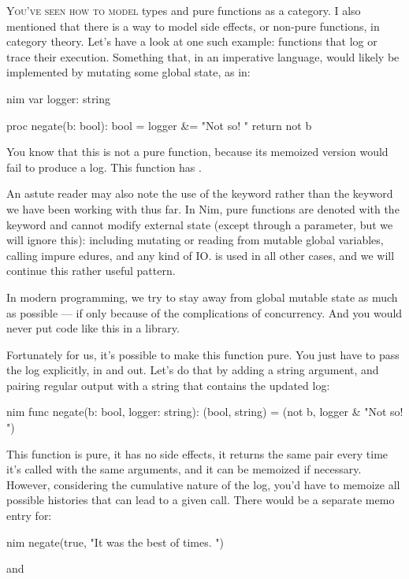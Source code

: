 
\lettrine[lhang=0.17]{Y}{ou've seen how to model} types and pure functions as a category. I also
mentioned that there is a way to model side effects, or non-pure
functions, in category theory. Let's have a look at one such example:
functions that log or trace their execution. Something that, in an
imperative language, would likely be implemented by mutating some global
state, as in:

\begin{snip}{nim}
var logger: string

proc negate(b: bool): bool =
  logger &= "Not so! "
  return not b
\end{snip}
You know that this is not a pure function, because its memoized version
would fail to produce a log. This function has .

An astute reader may also note the use of the  keyword rather
than the  keyword we have been working with thus far. In Nim, pure
functions are denoted with the  keyword and cannot modify external
state (except through a  parameter, but we will ignore this):
including mutating or reading from mutable global variables, calling impure
edures, and any kind of IO.  is used in all other cases,
and we will continue this rather useful pattern.

In modern programming, we try to stay away from global mutable state as
much as possible --- if only because of the complications of
concurrency. And you would never put code like this in a library.

Fortunately for us, it's possible to make this function pure. You just
have to pass the log explicitly, in and out. Let's do that by adding a
string argument, and pairing regular output with a string that contains
the updated log:

\begin{snip}{nim}
func negate(b: bool, logger: string): (bool, string) =
  (not b, logger & "Not so! ")
\end{snip}
This function is pure, it has no side effects, it returns the same pair
every time it's called with the same arguments, and it can be memoized
if necessary. However, considering the cumulative nature of the log,
you'd have to memoize all possible histories that can lead to a given
call. There would be a separate memo entry for:

\begin{snip}{nim}
negate(true, "It was the best of times. ")
\end{snip}
and

